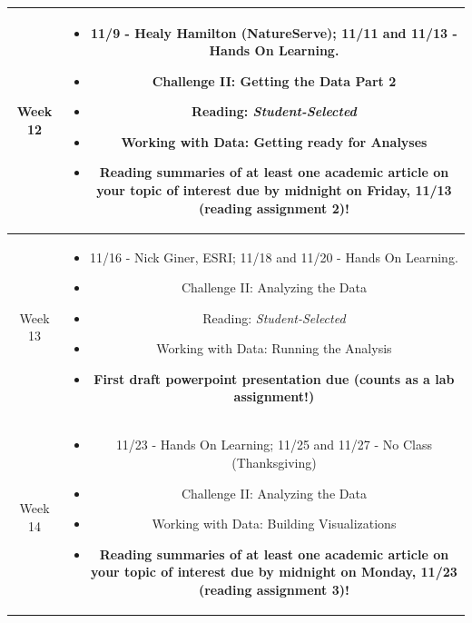 \documentclass[11pt]{article}
\begin{document}
\begin{table}[h!]
\begin{tabular}{ | c | c | }
Week 12 & \begin{minipage}{.85\textwidth}
\begin{itemize} \itemsep-0.4em
	\vspace{1mm}
	\item 11/9 - Healy Hamilton (NatureServe); 11/11 and 11/13 - Hands On Learning.
	\item Challenge II: Getting the Data Part 2
	\item Reading: \textit{Student-Selected}
	\item Working with Data: Getting ready for Analyses
	\item \textbf{Reading summaries of at least one academic article on your topic of interest due by midnight on Friday, 11/13 (reading assignment 2)!}
	\vspace{1mm}
\end{itemize}
\end{minipage} \\
\hline

Week 13 & \begin{minipage}{.85\textwidth}
\begin{itemize} \itemsep-0.4em
	\vspace{1mm}
	\item 11/16 - Nick Giner, ESRI; 11/18 and 11/20 - Hands On Learning.
	\item Challenge II: Analyzing the Data
	\item Reading: \textit{Student-Selected}
	\item Working with Data: Running the Analysis
	\item \textbf{First draft powerpoint presentation due (counts as a lab assignment!)}
	\vspace{1mm}
\end{itemize}
\end{minipage} \\
\hline

Week 14 & \begin{minipage}{.85\textwidth}
\begin{itemize} \itemsep-0.4em
	\vspace{1mm}
	\item 11/23 - Hands On Learning; 11/25 and 11/27 - No Class (Thanksgiving)
	\item Challenge II: Analyzing the Data
	\item Working with Data: Building Visualizations
	\item \textbf{Reading summaries of at least one academic article on your topic of interest due by midnight on Monday, 11/23 (reading assignment 3)!}
	\vspace{1mm}
\end{itemize}
\end{minipage} \\
\hline


\end{tabular}
\end{table}
\end{document}

